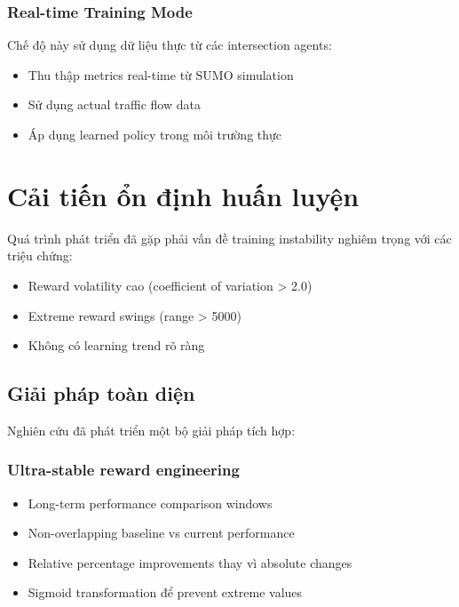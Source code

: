 \subsubsection{Real-time Training Mode}
Chế độ này sử dụng dữ liệu thực từ các intersection agents:
\begin{itemize}
    \item Thu thập metrics real-time từ SUMO simulation

    \item Sử dụng actual traffic flow data

    \item Áp dụng learned policy trong môi trường thực
\end{itemize}

\section{Cải tiến ổn định huấn luyện}

Quá trình phát triển đã gặp phải vấn đề training instability nghiêm trọng với các
triệu chứng:
\begin{itemize}
    \item Reward volatility cao (coefficient of variation > 2.0)

    \item Extreme reward swings (range > 5000)

    \item Không có learning trend rõ ràng
\end{itemize}

\subsection{Giải pháp toàn diện}
Nghiên cứu đã phát triển một bộ giải pháp tích hợp:

\subsubsection{Ultra-stable reward engineering}
\begin{itemize}
    \item Long-term performance comparison windows

    \item Non-overlapping baseline vs current performance

    \item Relative percentage improvements thay vì absolute changes

    \item Sigmoid transformation để prevent extreme values
\end{itemize}

